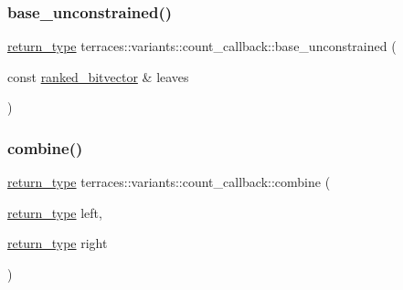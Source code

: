 \mbox{\label{classterraces_1_1variants_1_1count__callback_ad4d7c49a1a82c88db125eaf9241ea8d4}} 
\subsubsection{\texorpdfstring{base\+\_\+unconstrained()}{base\_unconstrained()}}
{\footnotesize\ttfamily \hyperlink{classterraces_1_1variants_1_1count__callback_adb8cc586b7f8d5aeaa4d1d83c36c5cb8}{return\+\_\+type} terraces\+::variants\+::count\+\_\+callback\+::base\+\_\+unconstrained (\begin{DoxyParamCaption}\item[{const \hyperlink{namespaceterraces_acc45ec9c561024c50ecbce5b6738ba08}{ranked\+\_\+bitvector} \&}]{leaves }\end{DoxyParamCaption})\hspace{0.3cm}{\ttfamily [inline]}}

\mbox{\label{classterraces_1_1variants_1_1count__callback_afb224c2b473fd827ffe7be77365ab947}} 
\subsubsection{\texorpdfstring{combine()}{combine()}}
{\footnotesize\ttfamily \hyperlink{classterraces_1_1variants_1_1count__callback_adb8cc586b7f8d5aeaa4d1d83c36c5cb8}{return\+\_\+type} terraces\+::variants\+::count\+\_\+callback\+::combine (\begin{DoxyParamCaption}\item[{\hyperlink{classterraces_1_1variants_1_1count__callback_adb8cc586b7f8d5aeaa4d1d83c36c5cb8}{return\+\_\+type}}]{left,  }\item[{\hyperlink{classterraces_1_1variants_1_1count__callback_adb8cc586b7f8d5aeaa4d1d83c36c5cb8}{return\+\_\+type}}]{right }\end{DoxyParamCaption})\hspace{0.3cm}{\ttfamily [inline]}}

